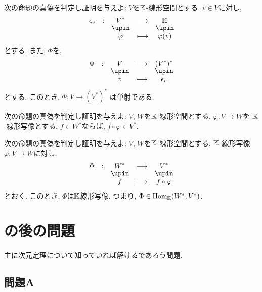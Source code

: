 \begin{quiz}
  次の命題の真偽を判定し証明を与えよ:
  $V$を$\mathbb{K}$-線形空間とする.
  $v\in V$に対し,
  \begin{align*}
    \shazo{\epsilon_v}{V^\ast}{\KK}
    {\varphi}{\varphi(v)}
  \end{align*}
  とする.
  また, $\Phi$を,
  \begin{align*}
    \shazo{\Phi}{V}{(V^\ast)^\ast}
    {v}{\epsilon_v}
  \end{align*}
  とする.
  このとき, 
  $\Phi\colon V\to (V^\ast)^\ast$
  は単射である.    
\end{quiz}

\begin{quiz}
  次の命題の真偽を判定し証明を与えよ:
  $V$, $W$を$\mathbb{K}$-線形空間とする.
  $\varphi\colon V\to W$を
  $\mathbb{K}$-線形写像とする.
  $f\in W^\ast$ならば,
  $f\circ \varphi\in V^\ast$.
\end{quiz}

\begin{quiz}
  次の命題の真偽を判定し証明を与えよ:
  $V$, $W$を$\mathbb{K}$-線形空間とする.
  $\mathbb{K}$-線形写像
  $\varphi\colon V\to W$に対し,
  \begin{align*}
    \shazo{\Phi}{W^\ast}{V^\ast}
    {f}{f\circ \varphi}
  \end{align*}
  とおく.
  このとき,
  $\Phi$は$\mathbb{K}$線形写像.
  つまり,
   $\Phi \in \operatorname{Hom}_{\mathbb{K}}(W^\ast,{V^\ast})$.
\end{quiz}


\section{の後の問題}
主に次元定理について知っていれば解けるであろう問題.

\subsection{問題A}


